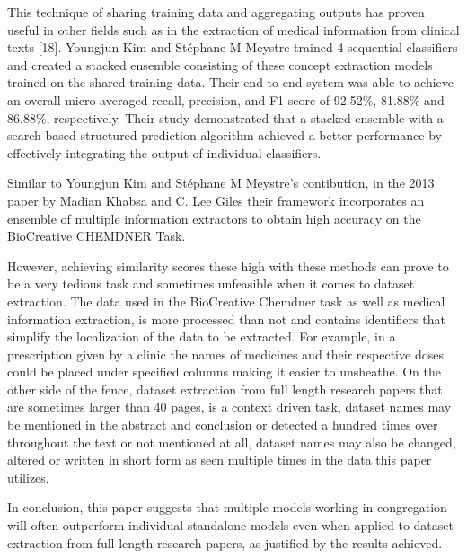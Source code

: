\documentclass[twocolumn]{article}
\begin{document}
This technique of sharing training data and aggregating outputs has proven useful in other fields such as in the extraction of medical information from clinical texts [18]. Youngjun Kim and Stéphane M Meystre trained 4 sequential classifiers and created a stacked ensemble consisting of these concept extraction models trained on the shared training data. Their end-to-end system was able to achieve an overall micro-averaged recall, precision, and F1 score of 92.52\%, 81.88\% and 86.88\%, respectively. Their study demonstrated that a stacked ensemble with a search-based structured prediction algorithm achieved a better performance by effectively integrating the output of individual classifiers.

Similar to Youngjun Kim and Stéphane M Meystre's contibution, in the 2013 paper by Madian Khabsa and C. Lee Giles their framework incorporates an ensemble of multiple information extractors to obtain high accuracy on the BioCreative CHEMDNER Task.

However, achieving similarity scores these high with these methods can prove to be a very tedious task and sometimes unfeasible when it comes to dataset extraction. The data used in the BioCreative Chemdner task as well as medical information extraction, is more processed than not and contains identifiers that simplify the localization of the data to be extracted. For example, in a prescription given by a clinic the names of medicines and their respective doses could be placed under specified columns making it easier to unsheathe. On the other side of the fence, dataset extraction from full length research papers that are sometimes larger than 40 pages, is a context driven task, dataset names may be mentioned in the abstract and conclusion or detected a hundred times over throughout the text or not mentioned at all, dataset names may also be changed, altered or written in short form as seen multiple times in the data this paper utilizes.

In conclusion, this paper suggests that multiple models working in congregation will often outperform individual standalone models even when applied to dataset extraction from full-length research papers, as justified by the results achieved.
\end{document}
